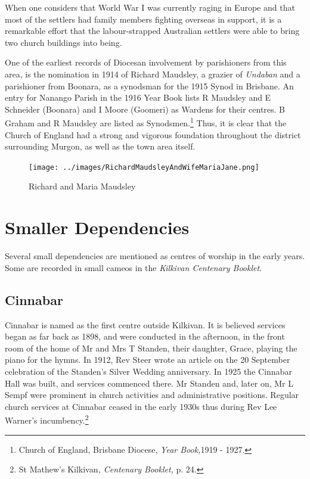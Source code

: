 When one considers that World War I was currently raging in Europe and that most of the settlers had family members fighting overseas in support, it is a remarkable effort that the labour-strapped Australian settlers were able to bring two church buildings into being.



One of the earliest records of Diocesan involvement by parishioners from this area, is the nomination in 1914 of Richard Maudsley, a grazier of \emph{Undaban} and a parishioner from Boonara, as a synodsman for the 1915 Synod in Brisbane. An entry for Nanango Parish in the 1916 Year Book lists R Maudsley and E Schneider (Boonara) and I Moore (Goomeri) as Wardens for their centres. B Graham and R Maudsley are listed as Synodsmen.\footnote{Church of England, Brisbane Diocese, \emph{Year Book,}1919 - 1927.} Thus, it is clear that the Church of England had a strong and vigorous foundation throughout the district surrounding Murgon, as well as the town area itself.








\begin{figure}
\begin{center}
\texttt{[image: ../images/RichardMaudsleyAndWifeMariaJane.png]}
\caption{Richard and Maria Maudsley}
\end{center}
\end{figure}




\section{Smaller Dependencies}



Several small dependencies are mentioned as centres of worship in the early years. Some are recorded in small cameos in the \emph{Kilkivan Centenary Booklet}.



\subsection{Cinnabar}



Cinnabar is named as the first centre outside Kilkivan. It is believed services began as far back as 1898, and were conducted in the afternoon, in the front room of the home of Mr and Mrs T Standen, their daughter, Grace, playing the piano for the hymns. In 1912, Rev Steer wrote an article on the 20 September celebration of the Standen's Silver Wedding anniversary. In 1925 the Cinnabar Hall was built, and services commenced there. Mr Standen and, later on, Mr L Sempf were prominent in church activities and administrative positions. Regular church services at Cinnabar ceased in the early 1930s thus during Rev Lee Warner's incumbency.\footnote{St Mathew's Kilkivan\emph{, Centenary Booklet,} p. 24.}


